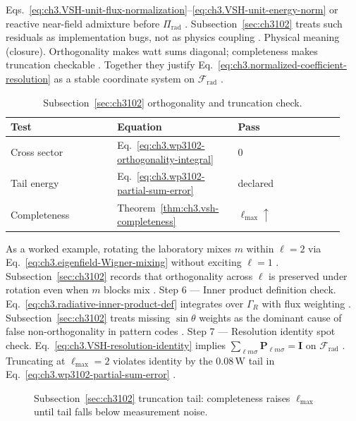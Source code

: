 Eqs.~\eqref{eq:ch3.VSH-unit-flux-normalization}--\eqref{eq:ch3.VSH-unit-energy-norm} or reactive near-field admixture before \(\Pi_{\mathrm{rad}}\)
\cite{harrington2001}. Subsection~\ref{sec:ch3102} treats such residuals as implementation bugs, not as physics coupling
\cite{harrington2001}.
Physical meaning (closure). Orthogonality makes watt sums diagonal; completeness makes truncation checkable \cite{hansen1988}. Together they
justify Eq.~\eqref{eq:ch3.normalized-coefficient-resolution} as a stable coordinate system on \(\mathcal{F}_{\mathrm{rad}}\)
\cite{kato1995}.
\begin{table}[t]
\centering
\caption{Subsection~\ref{sec:ch3102} orthogonality and truncation check.}
\label{tab:ch3.3102-audit}
\small
\begin{tabular}{@{}p{0.30\linewidth}p{0.34\linewidth}p{0.30\linewidth}@{}}
\toprule
Test & Equation & Pass \\
\midrule
Cross sector & Eq.~\eqref{eq:ch3.wp3102-orthogonality-integral} & $0$ \\
Tail energy & Eq.~\eqref{eq:ch3.wp3102-partial-sum-error} & declared \\
Completeness & Theorem~\ref{thm:ch3.vsh-completeness} & $\ell_{\max}\uparrow$ \\
\bottomrule
\end{tabular}
\end{table}
As a worked example, rotating the laboratory mixes \(m\) within \(\ell=2\) via Eq.~\eqref{eq:ch3.eigenfield-Wigner-mixing} without exciting \(\ell=1\)
\cite{jackson1999}. Subsection~\ref{sec:ch3102} records that orthogonality across \(\ell\) is preserved under rotation even when
\(m\) blocks mix \cite{harrington2001}.
Step 6 --- Inner product definition check. Eq.~\eqref{eq:ch3.radiative-inner-product-def} integrates over \(\Gamma_R\) with flux weighting \cite{stratton1941}.
Subsection~\ref{sec:ch3102} treats missing \(\sin\theta\) weights as the dominant cause of false non-orthogonality in pattern codes
\cite{hansen1988}.
Step 7 --- Resolution identity spot check. Eq.~\eqref{eq:ch3.VSH-resolution-identity} implies \(\sum_{\ell m\sigma}\mathbf{P}_{\ell m\sigma}=\mathbf{I}\) on \(\mathcal{F}_{\mathrm{rad}}\)
\cite{hansen1988}. Truncating at \(\ell_{\max}=2\) violates identity by the \(0.08\,\mathrm{W}\) tail in
Eq.~\eqref{eq:ch3.wp3102-partial-sum-error} \cite{harrington2001}.
\begin{figure}[t]
\centering
{}
\caption{Subsection~\ref{sec:ch3102} truncation tail: completeness raises $\ell_{\max}$ until tail falls below measurement noise.}
\label{fig:ch3.3102-truncation-tail}
\end{figure}
